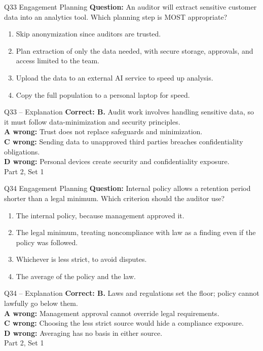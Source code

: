 \documentclass[aspectratio=169,10pt]{beamer}
\begin{document}
\begin{frame}[t]{Q33 \hfill {\scriptsize Engagement Planning}}
	\small
	\textbf{Question:} An auditor will extract sensitive customer data into an analytics tool. Which planning step is MOST appropriate?
	\begin{enumerate}[label=\Alph*.,itemsep=1pt,topsep=3pt]
			\item Skip anonymization since auditors are trusted.
			\item Plan extraction of only the data needed, with secure storage, approvals, and access limited to the team.
			\item Upload the data to an external AI service to speed up analysis.
			\item Copy the full population to a personal laptop for speed.
	\end{enumerate}
\end{frame}
\begin{frame}[t]{Q33 -- Explanation}
	\footnotesize
	\textbf{Correct: B.} Audit work involves handling sensitive data, so it must follow data-minimization and security principles. \\[5pt]
\textbf{A wrong:} Trust does not replace safeguards and minimization. \\[3pt]
\textbf{C wrong:} Sending data to unapproved third parties breaches confidentiality obligations. \\[3pt]
\textbf{D wrong:} Personal devices create security and confidentiality exposure. \\[3pt]
	\vfill {\tiny Part 2, Set 1}
\end{frame}
\begin{frame}[t]{Q34 \hfill {\scriptsize Engagement Planning}}
	\small
	\textbf{Question:} Internal policy allows a retention period shorter than a legal minimum. Which criterion should the auditor use?
	\begin{enumerate}[label=\Alph*.,itemsep=1pt,topsep=3pt]
			\item The internal policy, because management approved it.
			\item The legal minimum, treating noncompliance with law as a finding even if the policy was followed.
			\item Whichever is less strict, to avoid disputes.
			\item The average of the policy and the law.
	\end{enumerate}
\end{frame}
\begin{frame}[t]{Q34 -- Explanation}
	\footnotesize
	\textbf{Correct: B.} Laws and regulations set the floor; policy cannot lawfully go below them. \\[5pt]
\textbf{A wrong:} Management approval cannot override legal requirements. \\[3pt]
\textbf{C wrong:} Choosing the less strict source would hide a compliance exposure. \\[3pt]
\textbf{D wrong:} Averaging has no basis in either source. \\[3pt]
	\vfill {\tiny Part 2, Set 1}
\end{frame}
\end{document}
